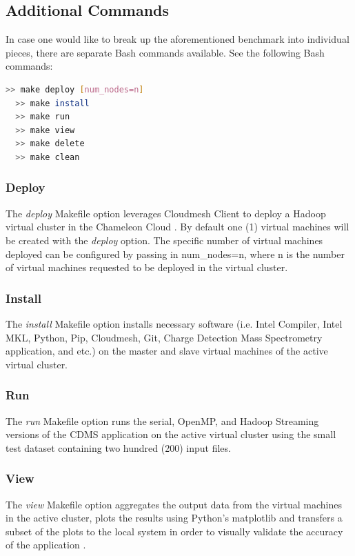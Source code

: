 \documentclass[9pt,twocolumn,twoside]{../../styles/osajnl}
\begin{document}
\subsection{Additional Commands} \label{other}
In case one would like to break up the aforementioned benchmark into
individual pieces, there are separate Bash commands available.
\noindent See the following Bash commands:
\begin{lstlisting}[language=bash]
  >> make deploy [num_nodes=n]
  >> make install
  >> make run
  >> make view
  >> make delete
  >> make clean
\end{lstlisting}

\subsubsection{Deploy}
The \emph{deploy} Makefile option leverages Cloudmesh Client to deploy
a Hadoop virtual cluster in the Chameleon Cloud
\cite{www-chameleon}. By default one (1) virtual machines will be
created with the \emph{deploy} option. The specific number of virtual
machines deployed can be configured by passing in num\_nodes=n, where
n is the number of virtual machines requested to be deployed in the
virtual cluster.

\subsubsection{Install}
The \emph{install} Makefile option installs necessary software
(i.e. Intel Compiler, Intel MKL, Python, Pip, Cloudmesh, Git, Charge
Detection Mass Spectrometry application, and etc.) on the master and
slave virtual machines of the active virtual cluster.

\subsubsection{Run}
The \emph{run} Makefile option runs the serial, OpenMP, and Hadoop
Streaming versions of the CDMS application on the active virtual
cluster using the small test dataset containing two hundred (200)
input files.

\subsubsection{View}
The \emph{view} Makefile option aggregates the output data from the
virtual machines in the active cluster, plots the results using
Python's matplotlib and transfers a subset of the plots to the local
system in order to visually validate the accuracy of the application
\cite{www-matplotlib}.
\end{document}
